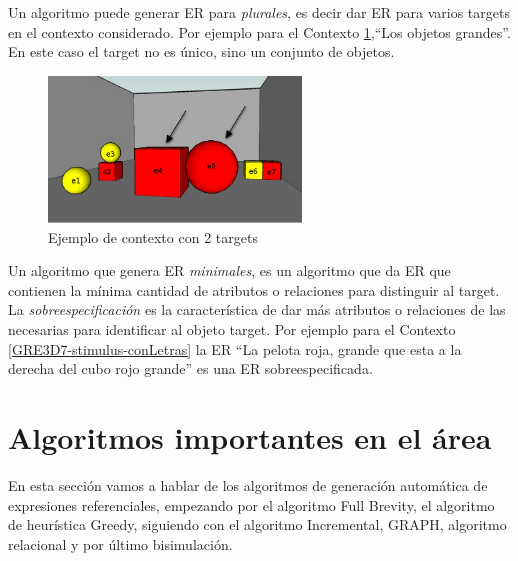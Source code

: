 Un algoritmo puede generar ER para {\it plurales}, es decir dar ER para varios targets en el contexto considerado. Por ejemplo para el Contexto \ref{plurales},``Los objetos grandes''. En este caso el target no es \'unico, sino un conjunto de objetos. \\

\begin{figure}[ht]
\centering
\includegraphics[width=0.6\textwidth]{images/22-plural.jpg}
\caption{Ejemplo de contexto con 2 targets}
\label{plurales}
\end{figure}

Un algoritmo que genera ER {\it minimales}, es un algoritmo que da ER que contienen la m\'inima cantidad de atributos o relaciones para distinguir al target.\\

La {\it sobreespecificaci\'on} es la caracter\'istica de dar m\'as atributos o relaciones de las necesarias para identificar al objeto target. Por ejemplo para el Contexto \ref{GRE3D7-stimulus-conLetras} la ER ``La pelota roja, grande que esta a la derecha del cubo rojo grande'' es una ER sobreespecificada.\\


\section{Algoritmos importantes en el \'area}

En esta secci\'on vamos a hablar de los algoritmos de generaci\'on autom\'atica de expresiones referenciales, empezando por el algoritmo Full Brevity, el algoritmo de heur\'istica Greedy, siguiendo con el algoritmo Incremental, GRAPH, algoritmo relacional y por \'ultimo bisimulaci\'on.  \\

